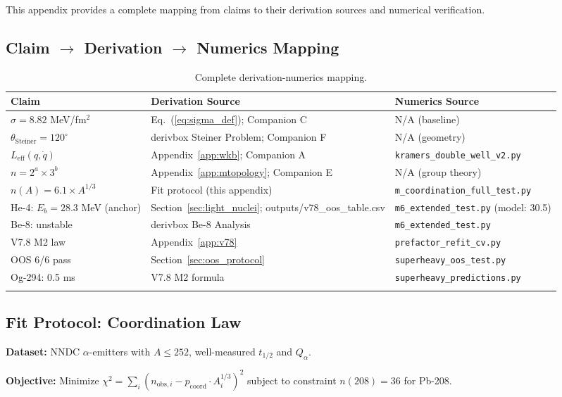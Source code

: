 \documentclass[11pt,a4paper]{article}
\begin{document}
This appendix provides a complete mapping from claims to their derivation sources and numerical verification.

\subsection{Claim $\to$ Derivation $\to$ Numerics Mapping}

\begin{longtable}{p{3cm}p{4.5cm}p{4.5cm}}
\toprule
\textbf{Claim} & \textbf{Derivation Source} & \textbf{Numerics Source} \\
\midrule
\endhead
$\sigma = 8.82$ MeV/fm$^2$ & Eq.~(\ref{eq:sigma_def}); Companion C & N/A (baseline) \\
$\theta_{\text{Steiner}} = 120^\circ$ & derivbox Steiner Problem; Companion F & N/A (geometry) \\
$L_{\text{eff}}(q, \dot{q})$ & Appendix~\ref{app:wkb}; Companion A & \texttt{kramers\_double\_well\_v2.py} \\
$n = 2^a \times 3^b$ & Appendix~\ref{app:mtopology}; Companion E & N/A (group theory) \\
$n(A) = 6.1 \times A^{1/3}$ & Fit protocol (this appendix) & \texttt{m\_coordination\_full\_test.py} \\
He-4: $E_b = 28.3$ MeV (anchor) & Section~\ref{sec:light_nuclei}; outputs/v78\_oos\_table.csv & \texttt{m6\_extended\_test.py} (model: 30.5) \\
Be-8: unstable & derivbox Be-8 Analysis & \texttt{m6\_extended\_test.py} \\
V7.8 M2 law & Appendix~\ref{app:v78} & \texttt{prefactor\_refit\_cv.py} \\
OOS 6/6 pass & Section~\ref{sec:oos_protocol} & \texttt{superheavy\_oos\_test.py} \\
Og-294: 0.5 ms & V7.8 M2 formula & \texttt{superheavy\_predictions.py} \\
\bottomrule
\caption{Complete derivation-numerics mapping.}
\end{longtable}

\subsection{Fit Protocol: Coordination Law}

\textbf{Dataset:} NNDC $\alpha$-emitters with $A \leq 252$, well-measured $t_{1/2}$ and $Q_\alpha$.

\textbf{Objective:} Minimize $\chi^2 = \sum_i (n_{\text{obs},i} - p_{\mathrm{coord}} \cdot A_i^{1/3})^2$ subject to constraint $n(208) = 36$ for Pb-208.
\end{document}
